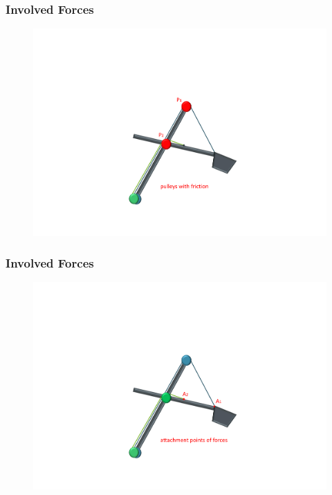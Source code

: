 \begin{frame}
	\frametitle{Involved Forces}
	
	\begin{figure}[bth]
	  \begin{center}
	    \includegraphics[trim=22cm 5cm 2cm 24cm, clip=true, 
	    width=\linewidth]{img/Excavator_Only2}
	  \end{center}
	\end{figure}

\end{frame}

\begin{frame}
	\frametitle{Involved Forces}
	
	\begin{figure}[bth]
	  \begin{center}
	    \includegraphics[trim=22cm 5cm 2cm 24cm, clip=true, 
	    width=\linewidth]{img/Excavator_Only3}
	  \end{center}
	\end{figure}

\end{frame}

